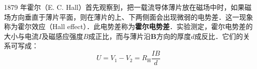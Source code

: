 
1879 年霍尔（E. C. Hall）首先观察到，把一载流导体薄片放在磁场中时，如果磁场方向垂直于薄片平面，则在薄片的上、下两侧面会出现微弱的电势差．这一现象称为霍尔效应（Hall effect）．此电势差称为\textbf{霍尔电势差}．实验测定，霍尔电势差的大小与电流$I$及磁感应强度$B$成正比，而与薄片沿$\mathbf B$方向的厚度$d$成反比．它们的关系可写成：
\begin{equation}
U=V_{1}-V_{2}=R_{\mathrm{H}} \frac{I B}{d}
\end{equation}